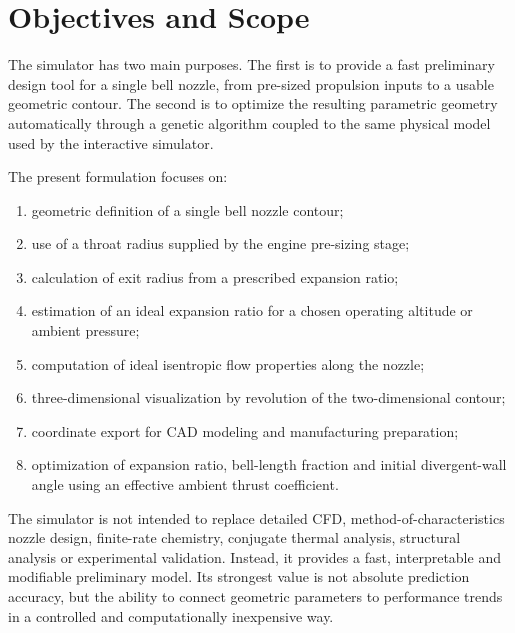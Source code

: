\section{Objectives and Scope}

The simulator has two main purposes. The first is to provide a fast preliminary design tool for a single bell nozzle, from pre-sized propulsion inputs to a usable geometric contour. The second is to optimize the resulting parametric geometry automatically through a genetic algorithm coupled to the same physical model used by the interactive simulator.

The present formulation focuses on:
\begin{enumerate}
    \item geometric definition of a single bell nozzle contour;
    \item use of a throat radius supplied by the engine pre-sizing stage;
    \item calculation of exit radius from a prescribed expansion ratio;
    \item estimation of an ideal expansion ratio for a chosen operating altitude or ambient pressure;
    \item computation of ideal isentropic flow properties along the nozzle;
    \item three-dimensional visualization by revolution of the two-dimensional contour;
    \item coordinate export for CAD modeling and manufacturing preparation;
    \item optimization of expansion ratio, bell-length fraction and initial divergent-wall angle using an effective ambient thrust coefficient.
\end{enumerate}

The simulator is not intended to replace detailed CFD, method-of-characteristics nozzle design, finite-rate chemistry, conjugate thermal analysis, structural analysis or experimental validation. Instead, it provides a fast, interpretable and modifiable preliminary model. Its strongest value is not absolute prediction accuracy, but the ability to connect geometric parameters to performance trends in a controlled and computationally inexpensive way.

% 
